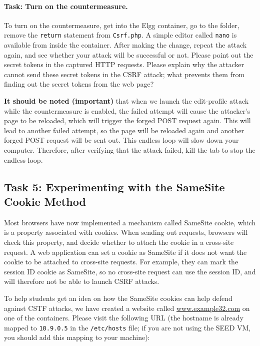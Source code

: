 \paragraph{Task: Turn on the countermeasure.}
To turn on the countermeasure, get into the Elgg container, 
go to the  
folder, remove the \texttt{return} statement from \texttt{Csrf.php}.
A simple editor called \texttt{nano} is available from inside the 
container.  After making the change, 
repeat the attack again, and see whether your attack will
be successful or not. 
Please point out the secret tokens in the captured HTTP requests.
Please explain why
the attacker cannot send these secret tokens in the CSRF attack; what
prevents them from finding out the secret tokens from the web page?   

\textbf{It should be noted (important)} that when we launch the edit-profile attack
while the countermeasure is enabled, the failed attempt will
cause the attacker's page to be reloaded, which will
trigger the forged POST request again. This will lead to another 
failed attempt, so the page will be reloaded again and 
another forged POST request will be sent out. This endless loop
will slow down your computer. Therefore, after verifying that 
the attack failed, kill the tab to stop the endless loop. 



\subsection{Task 5: Experimenting with the SameSite Cookie Method} 

Most browsers have now implemented a mechanism called SameSite cookie, 
which is a property associated with cookies. When sending out 
requests, browsers will check this property, and decide whether 
to attach the cookie in a cross-site request. A web application can
set a cookie as SameSite if it does not want the cookie to be 
attached to cross-site requests. For example, they can mark
the session ID cookie as SameSite, so no cross-site request
can use the session ID, and will therefore not be able to 
launch CSRF attacks. 


To help students get an idea on how the SameSite cookies can
help defend against CSTF attacks, we have created a website
called \url{www.example32.com} on one of the containers. Please 
visit the following URL (the hostname is already mapped 
to \texttt{10.9.0.5} in the \texttt{/etc/hosts} file; if you are 
not using the SEED VM, you should add this mapping to your machine): 

